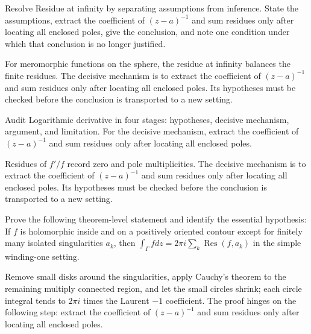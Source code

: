 \begin{problem}\label{prob:iv10-problem-06}
Resolve Residue at infinity by separating assumptions from inference. State the assumptions, extract the coefficient of \((z-a)^{-1}\) and sum residues only after locating all enclosed poles, give the conclusion, and note one condition under which that conclusion is no longer justified.
\end{problem}
\begin{solution}
For meromorphic functions on the sphere, the residue at infinity balances the finite residues. The decisive mechanism is to extract the coefficient of \((z-a)^{-1}\) and sum residues only after locating all enclosed poles. Its hypotheses must be checked before the conclusion is transported to a new setting.
\end{solution}

\begin{problem}\label{prob:iv10-problem-07}
Audit Logarithmic derivative in four stages: hypotheses, decisive mechanism, argument, and limitation. For the decisive mechanism, extract the coefficient of \((z-a)^{-1}\) and sum residues only after locating all enclosed poles.
\end{problem}
\begin{solution}
Residues of $f'/f$ record zero and pole multiplicities. The decisive mechanism is to extract the coefficient of \((z-a)^{-1}\) and sum residues only after locating all enclosed poles. Its hypotheses must be checked before the conclusion is transported to a new setting.
\end{solution}

\begin{problem}\label{prob:iv10-problem-08}
Prove the following theorem-level statement and identify the essential hypothesis: If $f$ is holomorphic inside and on a positively oriented contour except for finitely many isolated singularities $a_k$, then $\int_\Gamma fdz=2\pi i\sum_k\operatorname{Res}(f,a_k)$ in the simple winding-one setting.
\end{problem}
\begin{solution}
Remove small disks around the singularities, apply Cauchy's theorem to the remaining multiply connected region, and let the small circles shrink; each circle integral tends to $2\pi i$ times the Laurent $-1$ coefficient. The proof hinges on the following step: extract the coefficient of \((z-a)^{-1}\) and sum residues only after locating all enclosed poles.
\end{solution}

